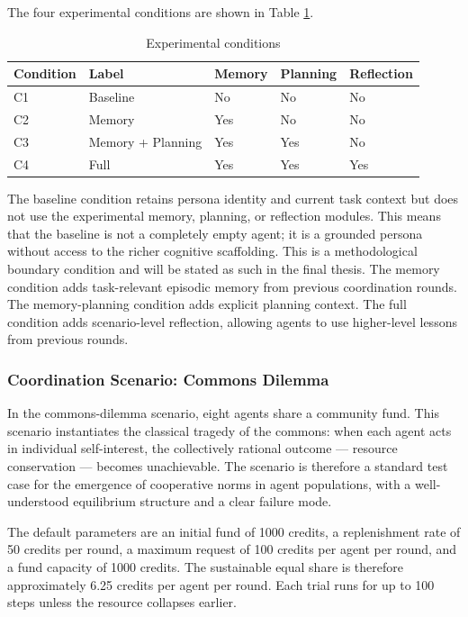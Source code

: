 \documentclass[11pt]{article}
\begin{document}
The four experimental conditions are shown in Table \ref{tab:conditions}.

\begin{table}[h]
\centering
\caption{Experimental conditions}
\label{tab:conditions}
\begin{tabular}{lllll}
\toprule
Condition & Label & Memory & Planning & Reflection \\
\midrule
C1 & Baseline & No & No & No \\
C2 & Memory & Yes & No & No \\
C3 & Memory + Planning & Yes & Yes & No \\
C4 & Full & Yes & Yes & Yes \\
\bottomrule
\end{tabular}
\end{table}

The baseline condition retains persona identity and current task context but does not use the experimental memory, planning, or reflection modules. This means that the baseline is not a completely empty agent; it is a grounded persona without access to the richer cognitive scaffolding. This is a methodological boundary condition and will be stated as such in the final thesis. The memory condition adds task-relevant episodic memory from previous coordination rounds. The memory-planning condition adds explicit planning context. The full condition adds scenario-level reflection, allowing agents to use higher-level lessons from previous rounds.

\subsubsection{Coordination Scenario: Commons Dilemma}
In the commons-dilemma scenario, eight agents share a community fund. This scenario instantiates the classical tragedy of the commons: when each agent acts in individual self-interest, the collectively rational outcome --- resource conservation --- becomes unachievable. The scenario is therefore a standard test case for the emergence of cooperative norms in agent populations, with a well-understood equilibrium structure and a clear failure mode.

The default parameters are an initial fund of 1000 credits, a replenishment rate of 50 credits per round, a maximum request of 100 credits per agent per round, and a fund capacity of 1000 credits. The sustainable equal share is therefore approximately 6.25 credits per agent per round. Each trial runs for up to 100 steps unless the resource collapses earlier.
\end{document}
